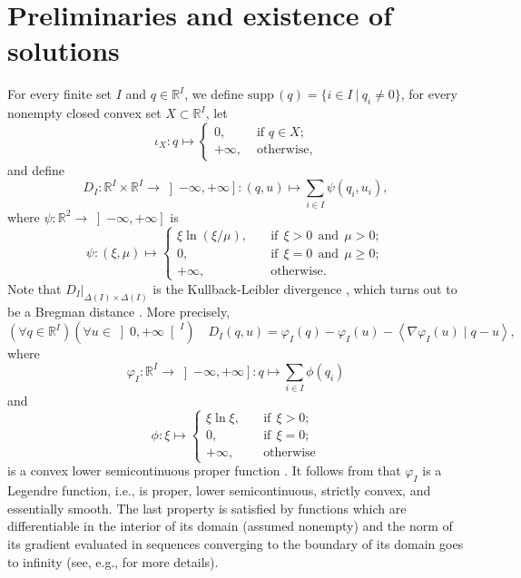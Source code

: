 \documentclass[smallextended,referee,envcountsect,]{svjour3}
\newcommand{\RPP}{\ensuremath{\left]0,+\infty\right[}}
\newcommand{\RX}{\ensuremath{\left]-\infty,+\infty\right]}}
\newcommand{\R}{{\mathbb R}}
\newcommand{\pinf}{\ensuremath{{+\infty}}}
\newcommand{\scal}[2]{{\left\langle{{#1}\mid{#2}}\right\rangle}}
\newcommand{\menge}[2]{\big\{{#1}~\big |~{#2}\big\}}
\newcommand{\supp}{\mathrm{supp}\,}
\begin{document}
\section{Preliminaries and existence of solutions}\label{sec:preliminaries}
For every finite set $I$ and $q\in \R^I$, we define 
$\supp(q)=\menge{i\in I}{q_i\ne 0}$, for every nonempty closed 
convex 
set $X\subset \R^{I}$, let
\begin{equation}
\iota_{X}\colon q\mapsto 
\begin{cases}
0,\quad &\text{ if }q\in X;\\
\pinf,&\text{ otherwise,}
\end{cases}
\end{equation}
and define 
\begin{equation}
\label{e:Kullback}
D_I\colon \R^{I}\times\R^{I}\to\RX\colon (q,u)\mapsto 
\sum\limits_{i\in I}
\psi(q_i,u_i),
\end{equation}
where
$\psi\colon\R^2\to\RX$ is 
\begin{equation}
\label{e:defpsi}
\psi\colon (\xi,\mu)\mapsto 
\begin{cases}
\xi\ln(\xi/\mu),\quad &\text{if}\:\: 
\xi> 0\:\:\text{and}\:\:\mu>0;\\
0,&\text{if}\:\:\xi=0\:\:\text{and}\:\:\mu\ge 0;\\
\pinf,&\text{otherwise}.
\end{cases}
\end{equation}
Note that $D_I|_{\Delta(I)\times \Delta(I)}$ is the 
Kullback-Leibler 
divergence 
\cite[Section~2.3]{cover-book-2006}, which turns out to be a 
Bregman distance \cite[Example~9.10]{Beck2017}. More precisely,
{
\begin{equation}
\label{e:Bdist}
(\forall q\in \R^I)(\forall u\in\RPP^I)\quad 
D_I(q,u)=\varphi_I(q)-\varphi_I(u)-\scal{\nabla\varphi_I(u)}{q-u},
\end{equation}
where
\begin{equation}
\label{e:defvarphi}
\varphi_I\colon \R^I\to \RX\colon q\mapsto \sum_{i\in I}\phi(q_i)
\end{equation}
and 
\begin{equation}
\label{e:defphi}
\phi\colon \xi\mapsto
\begin{cases}
\xi\ln\xi,\quad&\text{if}\:\: \xi> 0;\\
0,&\text{if}\:\: \xi=0;\\
\pinf,&\text{otherwise}
\end{cases}
\end{equation}
is a convex lower semicontinuous proper function
\cite[Example~9.35]{BauschkeCombettes17}. 
It follows from \cite[Example~2.1]{Teboulle18} that $\varphi_I$ is a 
Legendre function, i.e., is 
proper, lower semicontinuous, strictly convex, and essentially 
smooth. The last property is satisfied by functions which are
 differentiable in 
the interior of its domain (assumed nonempty) and the norm of its 
gradient evaluated in sequences converging to the boundary 
of its domain goes to infinity (see, e.g., 
\cite[Definition~2.1]{Teboulle18} for more details). 
}
\end{document}
